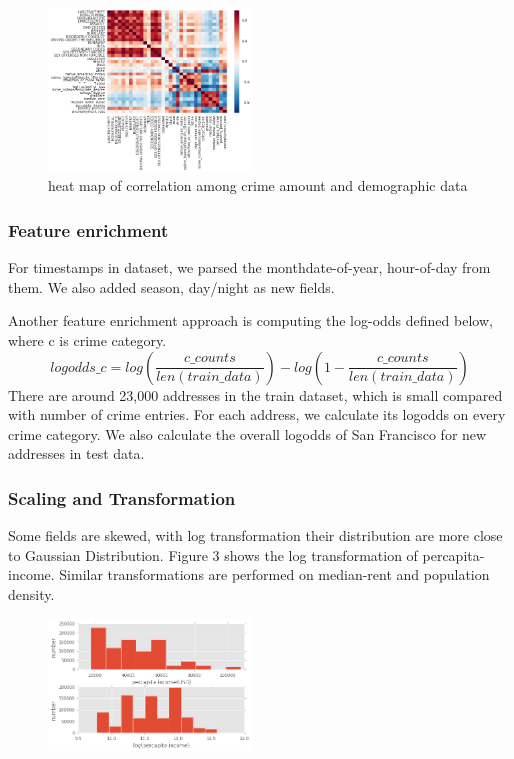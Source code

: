 \documentclass[11pt,conference]{IEEEtran}
\begin{document}
\begin{figure}[H]
\begin{center}
\includegraphics [width=0.48\textwidth]{pics/nh_category_corr.png}
\caption{heat map of correlation among crime amount and demographic data}
\end{center}
\end{figure}

\subsubsection{Feature enrichment}
For timestamps in dataset, we parsed the month\/date-of-year, hour-of-day from them. We also added season, day/night as new fields.

Another feature enrichment approach is computing the log-odds defined below, where c is crime category.
$$logodds\_c = log(\frac{c\_counts}{len(train\_data)}) - log(1 - \frac{c\_counts}{len(train\_data)})$$ There are around 23,000 addresses in the train dataset, which is small compared with number of crime entries. For each address, we calculate its logodds on every crime category. We also calculate the overall logodds of San Francisco for new addresses in test data. 

\subsubsection{Scaling and Transformation}
Some fields are skewed, with log transformation their distribution are more close to Gaussian Distribution. Figure 3 shows the log transformation of percapita-income. Similar transformations are performed on median-rent and population density.
\begin{figure}[H]
\begin{center}
\includegraphics [width=0.48\textwidth]{pics/percapita_income_log.png}
\caption{}
\end{center}
\end{figure}
\end{document}
